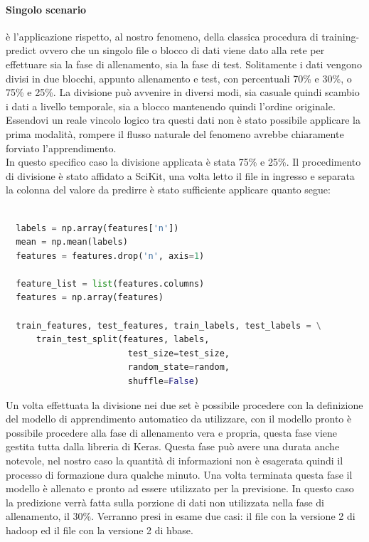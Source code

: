 \documentclass[%
    corpo=12pt,
    twoside,
    oldstyle,
    autoretitolo,
    greek,
    evenboxes,
]{toptesi}
\begin{document}
\paragraph{Singolo scenario} è l'applicazione rispetto, al nostro fenomeno, della classica procedura di training-predict ovvero che un singolo file o blocco di dati viene dato alla rete per effettuare sia la fase di allenamento, sia la fase di test. Solitamente i dati vengono divisi in due blocchi, appunto allenamento e test, con percentuali 70\% e 30\%, o 75\% e 25\%. La divisione può avvenire in diversi modi, sia casuale quindi scambio i dati a livello temporale, sia a blocco mantenendo quindi l'ordine originale. Essendovi un reale vincolo logico tra questi dati non è stato possibile applicare la prima modalità, rompere il flusso naturale del fenomeno avrebbe chiaramente forviato l'apprendimento.\\
In questo specifico caso la divisione applicata è stata 75\% e 25\%. Il procedimento di divisione è stato affidato a SciKit, una volta letto il file in ingresso e separata la colonna del valore da predirre è stato sufficiente applicare quanto segue:
\begin{lstlisting}[language=Python, frame=single, basicstyle=\small]
  
  labels = np.array(features['n'])
  mean = np.mean(labels)
  features = features.drop('n', axis=1) 
  
  feature_list = list(features.columns) 
  features = np.array(features)
  
  train_features, test_features, train_labels, test_labels = \
      train_test_split(features, labels, 
                        test_size=test_size, 
                        random_state=random, 
                        shuffle=False)
\end{lstlisting}
Un volta effettuata la divisione nei due set è possibile procedere con la definizione del modello di apprendimento automatico da utilizzare, con il modello pronto è possibile procedere alla fase di allenamento vera e propria, questa fase viene gestita tutta dalla libreria di Keras. Questa fase può avere una durata anche notevole, nel nostro caso la quantità di informazioni non è esagerata quindi il processo di formazione dura qualche minuto. Una volta terminata questa fase il modello è allenato e pronto ad essere utilizzato per la previsione. In questo caso la predizione verrà fatta sulla porzione di dati non utilizzata nella fase di allenamento, il 30\%. Verranno presi in esame due casi: il file con la versione 2 di hadoop ed il file con la versione 2 di hbase.\\
\end{document}
